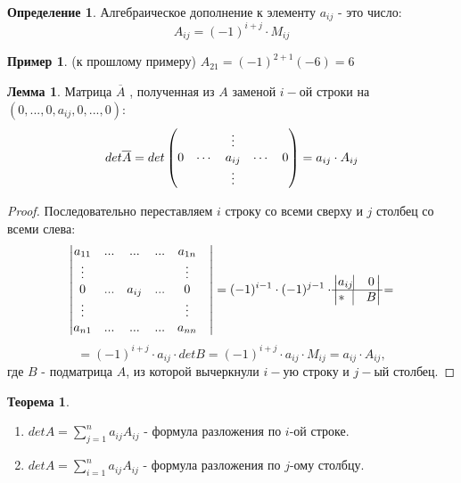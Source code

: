 \documentclass[a4paper, 12pt]{article}
\newcommand\tab[1][.5cm]{\hspace*{#1}}
\newcounter{thcount}
\theoremstyle{definition}
\newtheorem*{definition}{Определение}
\newtheorem*{lemma}{Лемма}
\newtheorem*{example1}{Пример}
\newtheorem{theoremnum}[thcount]{Теорема}
\begin{document}
  \begin{definition}
    Алгебраическое дополнение к элементу $a_{ij}$ - это число: $$A_{ij} = (-1)^{i+j} \cdot M_{ij}$$ 
  \end{definition} 
  \begin{example1}
    (к прошлому примеру) $A_{21} = (-1)^{2+1}(-6) = 6$  
  \end{example1}

  \begin{lemma}
    Матрица $\overline{A}$ , полученная из $A$ заменой $i-$ой строки на \\$(0,...,0,a_{ij},0,...,0)$:
    $$det \overline{A} = det \begin{pmatrix}
      \null & \null & \vdots & \null & \null \\
      0 & \cdots & a_{ij} & \cdots & 0 \\
      \null & \null & \vdots & \null & \null \end{pmatrix} = a_{ij} \cdot A_{ij}$$  
  \end{lemma} 
  \begin{proof}
    Последовательно переставляем $i$ строку со всеми сверху и $j$ столбец со всеми слева:
    $$\begin{vmatrix}
      a_{11} & ... & ... & ... & a_{1n} \\
      \vdots & \null & \null & \null & \vdots & \\
      0 & ... & a_{ij} & ... & 0 \\
      \vdots & \null & \null & \null & \vdots & \\
      a_{n1} &  ... & ... & ... & a_{nn}
    \end{vmatrix} = (-1)^{i-1} \cdot (-1)^{j-1} \cdot \begin{vmatrix}
      a_{ij} \vline &  0 \\
      \hline 
      * \ \ \vline & B
    \end{vmatrix} = $$ $$ =(-1)^{i+j} \cdot a_{ij}\cdot detB = (-1)^{i+j} \cdot a_{ij} \cdot M_{ij} = a_{ij}\cdot A_{ij},$$
    где $B$ - подматрица $A$, из которой вычеркнули $i-$ую строку и $j-$ый столбец.
  \end{proof} 
  \begin{theoremnum}
    \begin{enumerate} \tab
      \item $detA = \sum \limits_{j=1}^na_{ij}A_{ij}$ - формула разложения по $i$-ой строке.
      \item $detA = \sum \limits_{i=1}^na_{ij}A_{ij}$ - формула разложения по $j$-ому столбцу.
    \end{enumerate}
  \end{theoremnum} 
\end{document}
